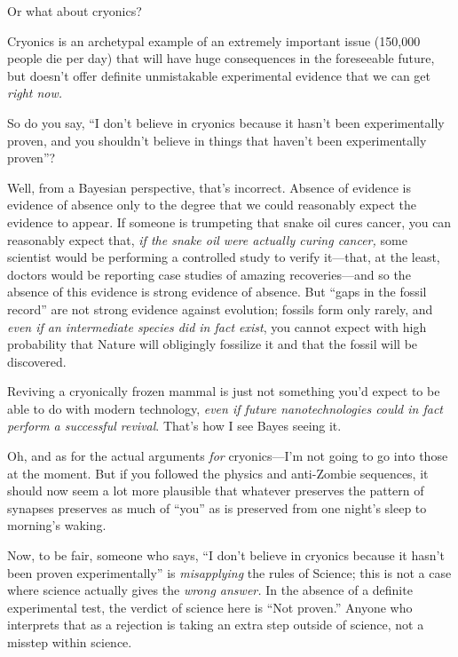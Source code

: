 {
 Or what about cryonics?}

{
 Cryonics is an archetypal example of an extremely important issue
(150,000 people die per day) that will have huge consequences in the
foreseeable future, but doesn't offer definite
unmistakable experimental evidence that we can get \textit{right now.}}

{
 So do you say, ``I don't believe
in cryonics because it hasn't been experimentally
proven, and you shouldn't believe in things that
haven't been experimentally
proven''?}

{
 Well, from a Bayesian perspective, that's
incorrect. Absence of evidence is evidence of absence only to the
degree that we could reasonably expect the evidence to appear. If
someone is trumpeting that snake oil cures cancer, you can reasonably
expect that, \textit{if the snake oil were actually curing cancer,}
some scientist would be performing a controlled study to verify
it---that, at the least, doctors would be reporting case studies of
amazing recoveries---and so the absence of this evidence is strong
evidence of absence. But ``gaps in the fossil
record'' are not strong evidence against evolution;
fossils form only rarely, and \textit{even if an intermediate species
did in fact exist}, you cannot expect with high probability that Nature
will obligingly fossilize it and that the fossil will be discovered.}

{
 Reviving a cryonically frozen mammal is just not something
you'd expect to be able to do with modern technology,
\textit{even if future nanotechnologies could in fact perform a
successful revival}. That's how I see Bayes seeing it.}

{
 Oh, and as for the actual arguments \textit{for}
cryonics---I'm not going to go into those at the
moment. But if you followed the physics and anti-Zombie sequences, it
should now seem a lot more plausible that whatever preserves the
pattern of synapses preserves as much of
``you'' as is preserved from one
night's sleep to morning's waking.}

{
 Now, to be fair, someone who says, ``I
don't believe in cryonics because it
hasn't been proven experimentally''
is \textit{misapplying} the rules of Science; this is not a case where
science actually gives the \textit{wrong answer.} In the absence of a
definite experimental test, the verdict of science here is
``Not proven.'' Anyone who
interprets that as a rejection is taking an extra step outside of
science, not a misstep within science.}

